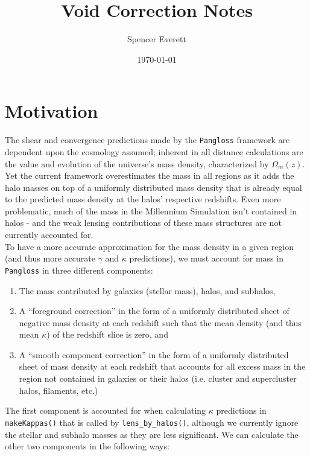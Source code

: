 \documentclass[12pt]{article}
\begin{document}
\setlength\parindent{0pt}

\vspace{-6in}

\title{Void Correction Notes}
\author{Spencer Everett}
\date{\today}

\maketitle

\section*{Motivation}

The shear and convergence predictions made by the \texttt{Pangloss} framework are dependent upon the cosmology assumed; inherent in all distance calculations are the value and evolution of the universe's mass density, characterized by $\Omega_m(z)$. Yet the current framework overestimates the mass in all regions as it adds the halo masses on top of a uniformly distributed mass density that is already equal to the predicted mass density at the halos' respective redshifts. Even more problematic, much of the mass in the Millennium Simulation isn't contained in halos - and the weak lensing contributions of these mass structures are not currently accounted for.\\

To have a more accurate approximation for the mass density in a given region (and thus more accurate $\gamma$ and $\kappa$ predictions), we must account for mass in \texttt{Pangloss} in three different components:

\begin{enumerate}[label=(\arabic*)]
\item The mass contributed by galaxies (stellar mass), halos, and subhalos,
\item A ``foreground correction'' in the form of a uniformly distributed sheet of negative mass density at each redshift such that the mean density (and thus mean $\kappa$) of the redshift slice is zero, and
\item A ``smooth component correction'' in the form of a uniformly distributed sheet of mass density at each redshift that accounts for all excess mass in the region not contained in galaxies or their halos (i.e. cluster and supercluster halos, filaments, etc.)
\end{enumerate}

The first component is accounted for when calculating $\kappa$ predictions in \texttt{makeKappas()} that is called by \texttt{lens\_by\_halos()}, although we currently ignore the stellar and subhalo masses as they are less significant. We can calculate the other two components in the following ways:
\end{document}
